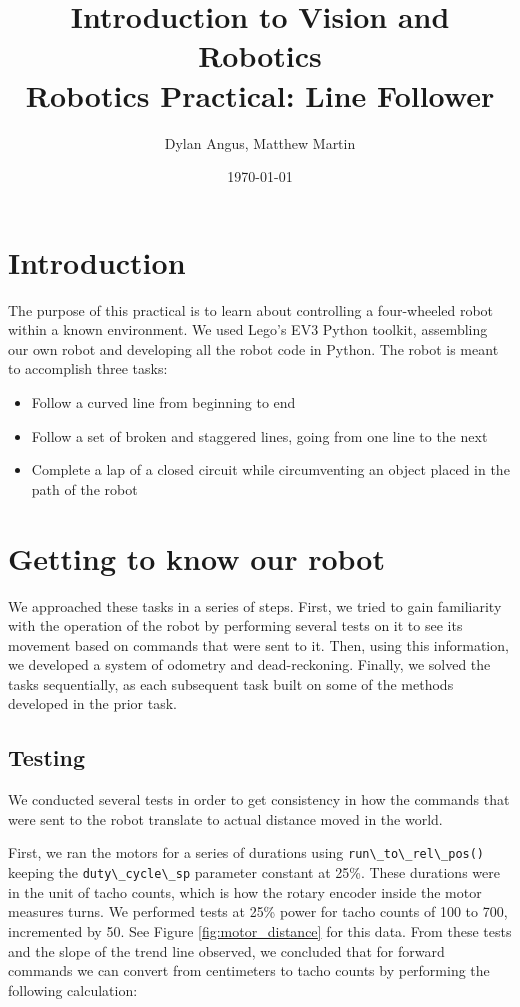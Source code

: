 \documentclass[12pt]{article}
\title{Introduction to Vision and Robotics\\Robotics Practical: Line Follower}
\author{Dylan Angus, Matthew Martin}
\date{\today}
\begin{document}
\newcommand{\code}[1]{
	\lstinline[basicstyle=\ttfamily]|#1|
}


\maketitle

\section{Introduction}

The purpose of this practical is to learn about controlling a four-wheeled robot within a known environment. We used Lego's EV3 Python toolkit, assembling our own robot and developing all the robot code in Python. The robot is meant to accomplish three tasks:

\begin{itemize}
	\item Follow a curved line from beginning to end
	\item Follow a set of broken and staggered lines, going from one line to the next
	\item Complete a lap of a closed circuit while circumventing an object placed in the path of the robot
\end{itemize}

\section{Getting to know our robot}

We approached these tasks in a series of steps. First, we tried to gain familiarity with the operation of the robot by performing several tests on it to see its movement based on commands that were sent to it. Then, using this information, we developed a system of odometry and dead-reckoning. Finally, we solved the tasks sequentially, as each subsequent task built on some of the methods developed in the prior task.

\subsection{Testing}

We conducted several tests in order to get consistency in how the commands that were sent to the robot translate to actual distance moved in the world.

First, we ran the motors for a series of durations using \code{run\_to\_rel\_pos()} keeping the \code{duty\_cycle\_sp} parameter constant at 25\%. These durations were in the unit of tacho counts, which is how the rotary encoder inside the motor measures turns. We performed tests at 25\% power for tacho counts of 100 to 700, incremented by 50. See Figure \ref{fig:motor_distance} for this data. From these tests and the slope of the trend line observed, we concluded that for forward commands we can convert from centimeters to tacho counts by performing the following calculation:
\end{document}

